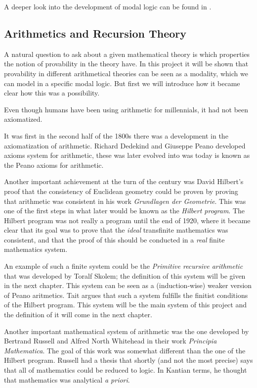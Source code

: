 \documentclass[../main.tex]{subfiles}
\begin{document}
A deeper look into the development of modal logic can be found in
\citet{Goldblatt2003}.
\subsection{Arithmetics and Recursion Theory}
A natural question to ask about a given mathematical theory is which properties
the notion of provability in the theory have. In this project it will be shown
that provability in different arithmetical theories  can be seen as a modality,
which we can model in a specific
modal logic. But first we will introduce how it became clear how this was a
possibility.

Even though humans have been using arithmetic for millennials, it had not been
axiomatized.

It was first in  the second half of the 1800s there was a development in the axiomatization
of arithmetic. Richard Dedekind and Giuseppe Peano developed axioms system for arithmetic,
these was later evolved into was today is known as the Peano axioms for
arithmetic. 

Another important achievement at the turn of the century was David Hilbert's
proof that the consistency of Euclidean geometry could be proven by proving
that arithmetic was consistent in his work  \textit{Grundlagen der Geometrie}.
This was one of the first steps in what later
would be known as the \textit{Hilbert program}. 
The Hilbert program was not really a program until the end of 1920, where it
became clear that its goal was to prove that the \textit{ideal} transfinite mathematics was
consistent, and that the proof of this should be conducted in a \textit{real}
finite mathematics system.

An example of such a finite system could be the \textit{Primitive recursive
arithmetic} that was developed by Toralf Skolem; the definition of this system
will be given in the next chapter. This system can be seen as a
(induction-wise) weaker version of Peano aritmetics. Tait  argues
that such a system fulfills the finitist conditions of the Hilbert program.
This system will be the main system of this project and the definition of it
will come in the next chapter.

Another  important mathematical system of arithmetic was
the one developed by Bertrand Russell and Alfred North Whitehead in their work
\textit{Principia Mathematica}. The goal of this work was somewhat different
than the one of the Hilbert program. Russell had a thesis that shortly (and not
the most precise) says that all of mathematics could be reduced to logic. In
Kantian terms, he thought that mathematics was analytical \textit{a priori}. 
\end{document}
